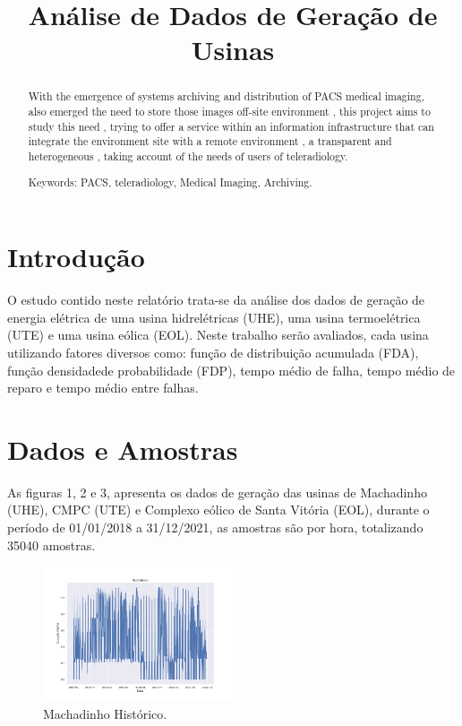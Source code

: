 \documentclass[conference]{IEEEtran}
\title{Análise de Dados de Geração de Usinas}
\author{
\IEEEauthorblockN{Leonardo Felipe da Silva dos Santos\\}
\IEEEauthorblockA{UFSM, PPGEE, CEESP \\ Email: leonardo.santos@acad.ufsm.br}
}
\begin{document}
\maketitle
\thispagestyle{empty}
\pagestyle{empty}


\begin{abstract}

With the emergence of systems archiving and distribution of PACS medical imaging, also emerged the need to store those images off-site environment , this project aims to study this need , trying to offer a service within an information infrastructure that can integrate the environment site with a remote environment , a transparent and heterogeneous , taking account of the needs of users of teleradiology.


Keywords: PACS, teleradiology, Medical Imaging, Archiving.

\end{abstract}


\section{Introdução}

O estudo contido neste relatório trata-se da análise dos dados de geração de energia elétrica de uma usina hidrelétricas (UHE), uma usina termoelétrica (UTE) e uma usina eólica (EOL). Neste trabalho serão avaliados, cada usina utilizando fatores diversos como: função de distribuição acumulada (FDA), função densidadede probabilidade (FDP), tempo médio de falha, tempo médio de reparo e tempo médio entre falhas.

\section{Dados e Amostras}

As figuras 1, 2 e 3, apresenta os dados de geração das usinas de Machadinho (UHE), CMPC (UTE) e Complexo eólico de Santa Vitória (EOL), durante o período de 01/01/2018 a 31/12/2021, as amostras são por hora, totalizando 35040 amostras.

\begin{figure}[h]
\includegraphics[width=0.5\textwidth]{Figuras/Machadinho_Historico.png}
\centering
\caption{Machadinho Histórico.}
\label{figura:Machadinho Histórico}
\end{figure}
\end{document}
